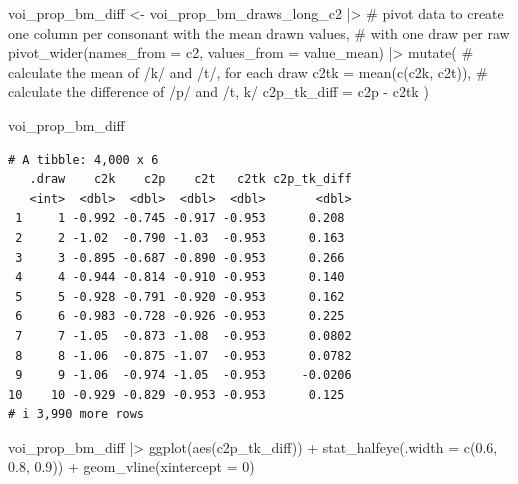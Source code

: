 \documentclass[
  authoryear,
  preprint,
  3p]{elsarticle}
\newenvironment{Shaded}{\begin{snugshade}}{\end{snugshade}}
\newcommand{\AttributeTok}[1]{\textcolor[rgb]{0.40,0.45,0.13}{#1}}
\newcommand{\CommentTok}[1]{\textcolor[rgb]{0.37,0.37,0.37}{#1}}
\newcommand{\DecValTok}[1]{\textcolor[rgb]{0.68,0.00,0.00}{#1}}
\newcommand{\FloatTok}[1]{\textcolor[rgb]{0.68,0.00,0.00}{#1}}
\newcommand{\FunctionTok}[1]{\textcolor[rgb]{0.28,0.35,0.67}{#1}}
\newcommand{\NormalTok}[1]{\textcolor[rgb]{0.00,0.23,0.31}{#1}}
\newcommand{\OtherTok}[1]{\textcolor[rgb]{0.00,0.23,0.31}{#1}}
\newcommand{\SpecialCharTok}[1]{\textcolor[rgb]{0.37,0.37,0.37}{#1}}
\begin{document}
\begin{Shaded}
\begin{Highlighting}[]
\NormalTok{voi\_prop\_bm\_diff }\OtherTok{\textless{}{-}}\NormalTok{ voi\_prop\_bm\_draws\_long\_c2 }\SpecialCharTok{|\textgreater{}} 
  \CommentTok{\# pivot data to create one column per consonant with the mean drawn values,}
  \CommentTok{\# with one draw per raw}
  \FunctionTok{pivot\_wider}\NormalTok{(}\AttributeTok{names\_from =}\NormalTok{ c2, }\AttributeTok{values\_from =}\NormalTok{ value\_mean) }\SpecialCharTok{|\textgreater{}} 
  \FunctionTok{mutate}\NormalTok{(}
    \CommentTok{\# calculate the mean of /k/ and /t/, for each draw}
    \AttributeTok{c2tk =} \FunctionTok{mean}\NormalTok{(}\FunctionTok{c}\NormalTok{(c2k, c2t)),}
    \CommentTok{\# calculate the difference of /p/ and /t, k/}
    \AttributeTok{c2p\_tk\_diff =}\NormalTok{ c2p }\SpecialCharTok{{-}}\NormalTok{ c2tk}
\NormalTok{  )}

\NormalTok{voi\_prop\_bm\_diff}
\end{Highlighting}
\end{Shaded}

\begin{verbatim}
# A tibble: 4,000 x 6
   .draw    c2k    c2p    c2t   c2tk c2p_tk_diff
   <int>  <dbl>  <dbl>  <dbl>  <dbl>       <dbl>
 1     1 -0.992 -0.745 -0.917 -0.953      0.208 
 2     2 -1.02  -0.790 -1.03  -0.953      0.163 
 3     3 -0.895 -0.687 -0.890 -0.953      0.266 
 4     4 -0.944 -0.814 -0.910 -0.953      0.140 
 5     5 -0.928 -0.791 -0.920 -0.953      0.162 
 6     6 -0.983 -0.728 -0.926 -0.953      0.225 
 7     7 -1.05  -0.873 -1.08  -0.953      0.0802
 8     8 -1.06  -0.875 -1.07  -0.953      0.0782
 9     9 -1.06  -0.974 -1.05  -0.953     -0.0206
10    10 -0.929 -0.829 -0.953 -0.953      0.125 
# i 3,990 more rows
\end{verbatim}

\begin{Shaded}
\begin{Highlighting}[]
\NormalTok{voi\_prop\_bm\_diff }\SpecialCharTok{|\textgreater{}} 
  \FunctionTok{ggplot}\NormalTok{(}\FunctionTok{aes}\NormalTok{(c2p\_tk\_diff)) }\SpecialCharTok{+}
  \FunctionTok{stat\_halfeye}\NormalTok{(}\AttributeTok{.width =} \FunctionTok{c}\NormalTok{(}\FloatTok{0.6}\NormalTok{, }\FloatTok{0.8}\NormalTok{, }\FloatTok{0.9}\NormalTok{)) }\SpecialCharTok{+}
  \FunctionTok{geom\_vline}\NormalTok{(}\AttributeTok{xintercept =} \DecValTok{0}\NormalTok{)}
\end{Highlighting}
\end{Shaded}
\end{document}
